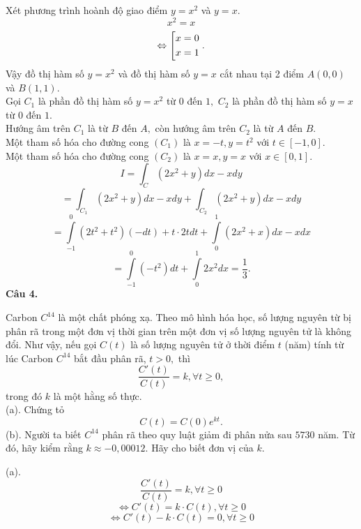 \documentclass[12pt,a4paper]{article}
\begin{document}
Xét phương trình hoành độ giao điểm \(y = x^2\) và \(y = x.\)
\[{x^2} = x\]
\[ \Leftrightarrow \left[ \begin{gathered}
  x = 0 \hfill \\
  x = 1 \hfill \\ 
\end{gathered}  \right..\]
Vậy đồ thị hàm số \(y = x^2\) và đồ thị hàm số \(y = x\) cắt nhau tại 2 điểm \(A \left( {0,0} \right)\) và \(B \left( {1, 1} \right).\)\\
Gọi \(C_1\) là phần đồ thị hàm số \(y = x^2\) từ \(0\) đến \(1,\) \(C_2\) là phần đồ thị hàm số \(y = x\) từ \(0\) đến \(1.\)\\
Hướng âm trên \(C_1\) là từ \(B\) đến \(A,\) còn hướng âm trên \(C_2\) là từ \(A\) đến \(B.\)\\
Một tham số hóa cho đường cong \(\left( {{C_1}} \right)\) là \(x = -t,y = {t^2}\) với \(t \in \left[ {-1,0} \right].\)\\
Một tham số hóa cho đường cong \(\left( {{C_2}} \right)\) là \(x = x,y = x\) với \(x \in \left[ {0,1} \right].\)
\[I = \int_C {\left( {2{x^2} + y} \right)dx - xdy} \]
\[ = \int_{{C_1}} {\left( {2{x^2} + y} \right)dx - xdy}  + \int_{{C_2}} {\left( {2{x^2} + y} \right)dx - xdy} \]
\[ = \int\limits_{ - 1}^0 {\left( {2{t^2} + {t^2}} \right)\left( { - dt} \right) + t \cdot 2tdt + \int\limits_0^1 {\left( {2{x^2} + x} \right)dx - xdx} } \]
\[ = \int\limits_{ - 1}^0 {\left( { - {t^2}} \right)dt + \int\limits_0^1 {2{x^2}dx} }  = \frac{1}{3}.\]
\textbf{Câu 4.}
\begin{mybox}
Carbon \(C^{14}\) là một chất phóng xạ. Theo mô hình hóa học, số lượng nguyên từ bị phân rã trong một đơn vị thời gian trên một đơn vị số lượng nguyên tử là không đổi. Như vậy, nếu gọi \(C \left( t \right)\) là số lượng nguyên tử ở thời điểm \(t\) (năm) tính từ lúc Carbon \(C^{14}\) bắt đầu phân rã, \(t > 0,\) thì \\
\[\frac{{C'\left( t \right)}}{{C\left( t \right)}} = k,\forall t \geqslant 0,\]
trong đó \(k\) là một hằng số thực.\\
(a). Chứng tỏ \[C\left( t \right) = C\left( 0 \right){e^{kt}}.\]
(b). Người ta biết \(C^{14}\) phân rã theo quy luật giảm đi phân nửa sau \(5730\) năm. Từ đó, hãy kiểm rằng \(k \approx -0,00012.\) Hãy cho biết đơn vị của \(k.\)
\end{mybox}
(a). \[\frac{{C'\left( t \right)}}{{C\left( t \right)}} = k,\forall t \ge 0\]
\[ \Leftrightarrow C'\left( t \right) = k \cdot C\left( t \right),\forall t \ge 0\]
\[ \Leftrightarrow C'\left( t \right) - k \cdot C\left( t \right) = 0,\forall t \ge 0\]
\end{document}
